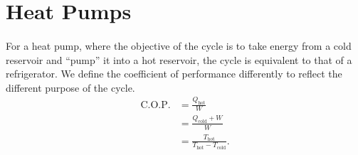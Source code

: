 \documentclass[../thermodynamics.tex]{subfiles}
\begin{document}
    \section{Heat Pumps}
        \paragraph{}
        For a heat pump, where the objective of the cycle is to take energy from a cold reservoir and ``pump'' it into a hot reservoir, the cycle is equivalent to that of a refrigerator.
        We define the coefficient of performance differently to reflect the different purpose of the cycle.
        \begin{align}
            \text{C.O.P.}&=\frac{Q_\text{hot}}{W}\\
            &=\frac{Q_\text{cold}+W}{W}\\
            &=\frac{T_\text{hot}}{T_\text{hot}-T_\text{cold}}.
        \end{align}
\end{document}

